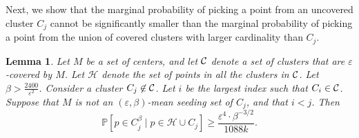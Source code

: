 \documentclass[11pt]{article}
\newtheorem{lemma}[theorem]{Lemma}
\begin{document}
Next, we show that the marginal probability of picking a point from an uncovered cluster $C_j$ cannot be significantly smaller than the marginal probability of picking a point from the union of covered clusters with larger cardinality than $C_j$.

\begin{lemma}
\label{lem:lbprob}
    Let $M$ be a set of centers, and let ${\cal C}$ denote a set of clusters that are $\varepsilon$-covered by $M$. Let $\mathcal{H}$ denote the set of points in all the clusters in ${\cal C}$. Let $\beta> \frac{2400}{\varepsilon^{2}}$. Consider a cluster $C_j\not\in {\cal C}$. Let $i$ be the largest index such that $C_i\in {\cal C}$. Suppose that $M$ is not an $(\varepsilon,\beta)$-mean seeding set of $C_j$, and that $i < j$. Then
    $$\mathbb{P}[p\in C_j^\beta\mid p\in \mathcal{H}\cup C_j] \geq \frac{\varepsilon^4 \cdot \beta^{-3/2}}{1088k}.$$
\end{lemma}
\end{document}
